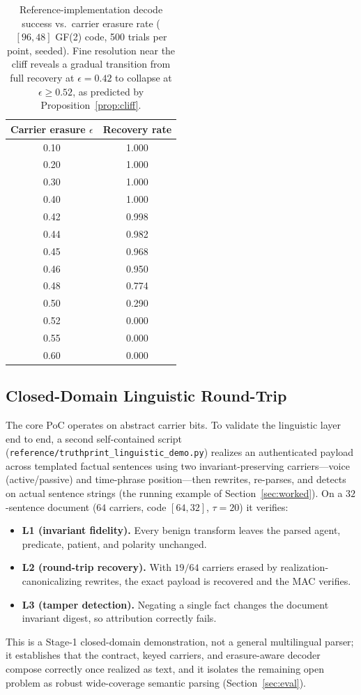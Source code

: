 \documentclass[journal]{IEEEtran}
\begin{document}
\begin{table}[t]
\centering
\caption{Reference-implementation decode success vs.\ carrier erasure rate
  ($[96,48]$ GF(2) code, 500 trials per point, seeded). Fine resolution
  near the cliff reveals a gradual transition from full recovery at
  $\epsilon=0.42$ to collapse at $\epsilon\ge0.52$, as predicted by
  Proposition~\ref{prop:cliff}.}
\label{tab:erasure}
\begin{tabular}{cc}
\toprule
Carrier erasure $\epsilon$ & Recovery rate \\
\midrule
0.10 & 1.000 \\
0.20 & 1.000 \\
0.30 & 1.000 \\
0.40 & 1.000 \\
0.42 & 0.998 \\
0.44 & 0.982 \\
0.45 & 0.968 \\
0.46 & 0.950 \\
0.48 & 0.774 \\
0.50 & 0.290 \\
0.52 & 0.000 \\
0.55 & 0.000 \\
0.60 & 0.000 \\
\bottomrule
\end{tabular}
\end{table}

\subsection{Closed-Domain Linguistic Round-Trip}
The core PoC operates on abstract carrier bits. To validate the linguistic
layer end to end, a second self-contained script
(\texttt{reference/\allowbreak truthprint\_\allowbreak linguistic\_\allowbreak demo.py}) realizes an authenticated
payload across templated factual sentences using two invariant-preserving
carriers---voice (active/passive) and time-phrase position---then rewrites,
re-parses, and detects on actual sentence strings (the running example of
Section~\ref{sec:worked}). On a $32$-sentence document ($64$ carriers, code
$[64,32]$, $\tau=20$) it verifies:
\begin{itemize}[leftmargin=*]
  \item \textbf{L1 (invariant fidelity).} Every benign transform leaves the
  parsed agent, predicate, patient, and polarity unchanged.
  \item \textbf{L2 (round-trip recovery).} With $19/64$ carriers erased by
  realization-canonicalizing rewrites, the exact payload is recovered and the
  MAC verifies.
  \item \textbf{L3 (tamper detection).} Negating a single fact changes the
  document invariant digest, so attribution correctly fails.
\end{itemize}
This is a Stage-1 closed-domain demonstration, not a general multilingual
parser; it establishes that the contract, keyed carriers, and erasure-aware
decoder compose correctly once realized as text, and it isolates the remaining
open problem as robust wide-coverage semantic parsing (Section~\ref{sec:eval}).
\end{document}
